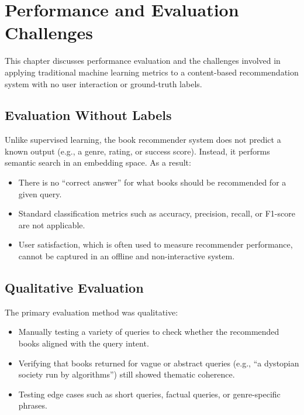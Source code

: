 \chapter{Performance and Evaluation Challenges}
\label{chapter:performance}

This chapter discusses performance evaluation and the challenges involved in applying traditional machine learning metrics to a content-based recommendation system with no user interaction or ground-truth labels.

\section{Evaluation Without Labels}
\label{sec:no-labels}

Unlike supervised learning, the book recommender system does not predict a known output (e.g., a genre, rating, or success score). Instead, it performs semantic search in an embedding space. As a result:

\begin{itemize}
    \item There is no “correct answer” for what books should be recommended for a given query.
    \item Standard classification metrics such as accuracy, precision, recall, or F1-score are not applicable.
    \item User satisfaction, which is often used to measure recommender performance, cannot be captured in an offline and non-interactive system.
\end{itemize}

\section{Qualitative Evaluation}
\label{sec:qualitative-eval}

The primary evaluation method was qualitative:

\begin{itemize}
    \item Manually testing a variety of queries to check whether the recommended books aligned with the query intent.
    \item Verifying that books returned for vague or abstract queries (e.g., “a dystopian society run by algorithms”) still showed thematic coherence.
    \item Testing edge cases such as short queries, factual queries, or genre-specific phrases.
\end{itemize}

